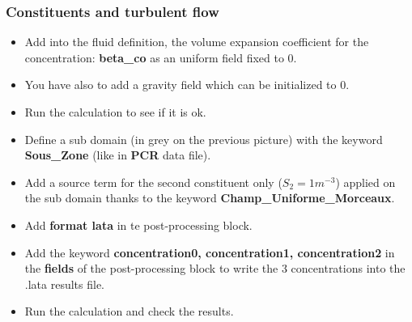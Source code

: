\documentclass[10pt, hyperref={unicode=true,pdfusetitle, bookmarks=true,bookmarksnumbered=false,bookmarksopen=false, breaklinks=false,pdfborder={0 0 1},backref=true,colorlinks=true,linkcolor=darkblue,pageanchor}]{beamer}
\begin{document}
\begin{frame}
\frametitle{Constituents and turbulent flow}
\begin{block}{}

\begin{itemize}
\item Add into the fluid definition, the volume expansion coefficient for the concentration: \textbf{beta\_co} as an uniform field fixed to 0.

\item You have also to add a gravity field which can be initialized to 0.

\item Run the calculation to see if it is ok.

\item Define a sub domain (in grey on the previous picture) with the keyword \textbf{Sous\_Zone} (like in \textbf{PCR} data file).

\item Add a source term for the second constituent only ($S_2=1m^{-3}$) applied on the sub domain thanks to the keyword \textbf{Champ\_Uniforme\_Morceaux}.

\item Add \textbf{format lata} in te post-processing block.

\item Add the keyword \textbf{concentration0, concentration1, concentration2} in the \textbf{fields} of the post-processing block to write the 3 concentrations into the .lata results file.

\item Run the calculation and check the results.
\end{itemize}

\end{block}
\end{frame}
\end{document}

